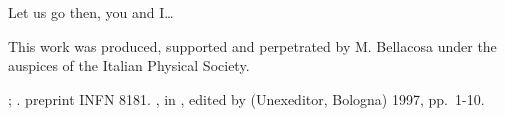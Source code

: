 \documentclass{subnucbo}
\begin{document}
\appendix

\section{}
Let us go then, you and I\ldots

\acknowledgments
This work was produced, supported and perpetrated by M. Bellacosa under
the auspices of the Italian Physical Society.

\begin{thebibliography}{0}
 
  ;
  .
 
  preprint INFN 8181.
 
  ,
  in ,
                  edited by 
                  (Unexeditor, Bologna) 1997, pp.~1-10.
\end{thebibliography}
\end{document}
